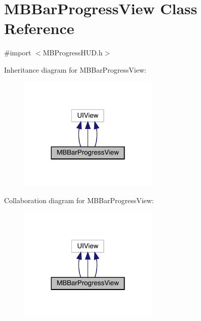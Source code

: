 \hypertarget{interface_m_b_bar_progress_view}{}\section{M\+B\+Bar\+Progress\+View Class Reference}
\label{interface_m_b_bar_progress_view}


{\ttfamily \#import $<$M\+B\+Progress\+H\+U\+D.\+h$>$}



Inheritance diagram for M\+B\+Bar\+Progress\+View\+:\nopagebreak
\begin{figure}[H]
\begin{center}
\leavevmode
\includegraphics[width=188pt]{interface_m_b_bar_progress_view__inherit__graph}
\end{center}
\end{figure}


Collaboration diagram for M\+B\+Bar\+Progress\+View\+:\nopagebreak
\begin{figure}[H]
\begin{center}
\leavevmode
\includegraphics[width=188pt]{interface_m_b_bar_progress_view__coll__graph}
\end{center}
\end{figure}
